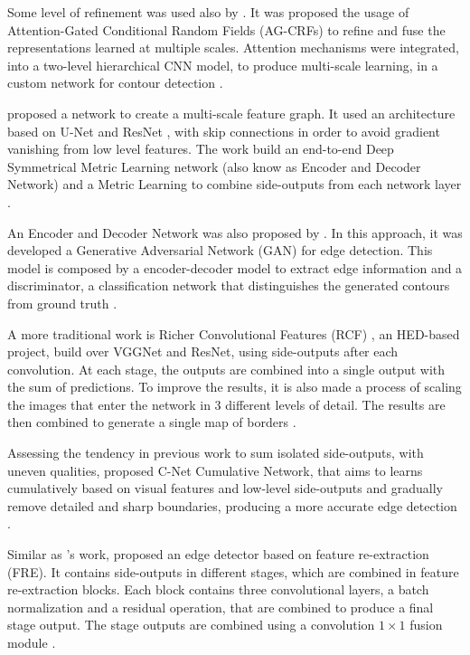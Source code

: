 Some level of refinement was used also by \cite{DeepStructured:2017:Xu20173962, Xu:2020}.
It was proposed the usage of Attention-Gated Conditional Random Fields (AG-CRFs) to refine and fuse the representations learned at multiple scales.
Attention mechanisms were integrated, into a two-level hierarchical CNN model, to produce multi-scale learning, in a custom network for contour detection \cite{DeepStructured:2017:Xu20173962}.

\cite{ProeminentEdge:2018:Cai2018} proposed a network to create a multi-scale feature graph.
It used an architecture based on U-Net \cite{Unet:2015} and ResNet \cite{RESNET:2016:7780459}, with skip connections in order to avoid gradient vanishing from low level features.
The work build an end-to-end Deep Symmetrical Metric Learning network (also know as Encoder and Decoder Network) and a Metric Learning to combine side-outputs from each network layer \cite{ProeminentEdge:2018:Cai2018}.

An Encoder and Decoder Network was also proposed by \cite{Yang:2019}.
In this approach, it was developed a Generative Adversarial Network (GAN) for edge detection.
This model is composed by a encoder-decoder model to extract edge information and a discriminator, a classification network that distinguishes the generated contours from ground truth \cite{Yang:2019}.

A more traditional work is Richer Convolutional Features (RCF) \cite{RCF:2019}, an HED-based project, build over VGGNet and ResNet, using side-outputs after each convolution.
At each stage, the outputs are combined into a single output with the sum of predictions.
To improve the results, it is also made a process of scaling the images that enter the network in 3 different levels of detail.
The results are then combined to generate a single map of borders \cite{RCF:2019}.

Assessing the tendency in previous work to sum isolated side-outputs, with uneven qualities, \cite{Cumulative:Song20181847} proposed C-Net Cumulative Network, that aims to learns cumulatively based on visual features and low-level side-outputs and gradually remove detailed and sharp boundaries, producing a more accurate edge detection \cite{Cumulative:Song20181847}.

Similar as \cite{Cumulative:Song20181847}'s work, \cite{ReExtraction:Wen201884} proposed an edge detector based on feature re-extraction (FRE).
It contains side-outputs in different stages, which are combined in feature re-extraction blocks.
Each block contains three convolutional layers, a batch normalization and a residual operation, that are combined to produce a final stage output.
The stage outputs are combined using a convolution $1 \times 1$ fusion module \cite{ReExtraction:Wen201884}.

